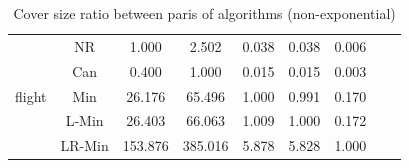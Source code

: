 \documentclass[11pt]{book}
\begin{document}
\begin{table}
\begin{tabular}{|c|c|c|c|c|c|c|c|c|}
    \hline
    \multirow{5}{*}{flight}
         & NR & 1.000 & 2.502 & 0.038 & 0.038 & 0.006 \\                                                                                                                                                             
         & Can & 0.400 & 1.000 & 0.015 & 0.015 & 0.003 \\                                                                                                                                                            
         & Min & 26.176 & 65.496 & 1.000 & 0.991 & 0.170 \\                                                                                                                                                          
         & L-Min & 26.403 & 66.063 & 1.009 & 1.000 & 0.172 \\                                                                                                                                                        
         & LR-Min & 153.876 & 385.016 & 5.878 & 5.828 & 1.000 \\          
              	
    \hline
    
\end{tabular}

	\caption{Cover size ratio between paris of algorithms (non-exponential)}

\end{table}
\end{document}
